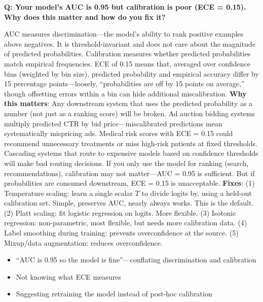 \begin{interviewq}
\textbf{Q: Your model's AUC is 0.95 but calibration is poor (ECE = 0.15). Why does this matter and how do you fix it?}

 \quad {} \quad \badgefreq{\freqhigh}

\stronganswer AUC measures discrimination---the model's ability to rank positive examples above negatives. It is threshold-invariant and does not care about the magnitude of predicted probabilities. Calibration measures whether predicted probabilities match empirical frequencies. ECE of 0.15 means that, averaged over confidence bins (weighted by bin size), predicted probability and empirical accuracy differ by 15 percentage points---loosely, ``probabilities are off by 15 points on average,'' though offsetting errors within a bin can hide additional miscalibration. \textbf{Why this matters}: Any downstream system that uses the predicted probability as a number (not just as a ranking score) will be broken. Ad auction bidding systems multiply predicted CTR by bid price---miscalibrated predictions mean systematically mispricing ads. Medical risk scores with ECE = 0.15 could recommend unnecessary treatments or miss high-risk patients at fixed thresholds. Cascading systems that route to expensive models based on confidence thresholds will make bad routing decisions. If you only use the model for ranking (search, recommendations), calibration may not matter---AUC = 0.95 is sufficient. But if probabilities are consumed downstream, ECE = 0.15 is unacceptable. \textbf{Fixes}: (1) Temperature scaling: learn a single scalar $T$ to divide logits by, using a held-out calibration set. Simple, preserves AUC, nearly always works. This is the default. (2) Platt scaling: fit logistic regression on logits. More flexible. (3) Isotonic regression: non-parametric, most flexible, but needs more calibration data. (4) Label smoothing during training: prevents overconfidence at the source. (5) Mixup/data augmentation: reduces overconfidence.

\redflags
\begin{itemize}
    \item ``AUC is 0.95 so the model is fine''---conflating discrimination and calibration
    \item Not knowing what ECE measures
    \item Suggesting retraining the model instead of post-hoc calibration
\end{itemize}


\end{interviewq}

